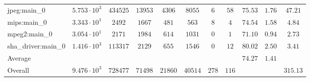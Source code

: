 \begin{tabular}{|l|c|c|c|c|c|c|c|c|c|c|}
jpeg:main\_0            & $ 5.753 \cdot 10^{3} $ & $ 434525 $ & $ 13953 $ & $ 4306  $ & $ 8055  $ & $ 6   $ & $ 58  $ & $ 75.53       $ & $ 1.76    $ & $ 47.21   $ \\
mips:main\_0            & $ 3.343 \cdot 10^{1} $ & $ 2492   $ & $ 1667  $ & $ 481   $ & $ 563   $ & $ 8   $ & $ 4   $ & $ 74.54       $ & $ 1.58    $ & $ 4.84    $ \\
mpeg2:main\_0           & $ 3.054 \cdot 10^{1} $ & $ 2171   $ & $ 1984  $ & $ 614   $ & $ 1031  $ & $ 0   $ & $ 1   $ & $ 71.10       $ & $ 0.94    $ & $ 2.73    $ \\
sha\_driver:main\_0     & $ 1.416 \cdot 10^{3} $ & $ 113317 $ & $ 2129  $ & $ 655   $ & $ 1546  $ & $ 0   $ & $ 12  $ & $ 80.02       $ & $ 2.50    $ & $ 3.41    $ \\
\hline
Average                 & $                    $ & $        $ & $       $ & $       $ & $       $ & $     $ & $     $ & $ 74.27       $ & $ 1.41    $ & $         $ \\
\hline
Overall                 & $ 9.476 \cdot 10^{3} $ & $ 728477 $ & $ 71498 $ & $ 21860 $ & $ 40514 $ & $ 278 $ & $ 116 $ & $             $ & $         $ & $ 315.13  $ \\
\hline
\end{tabular}
